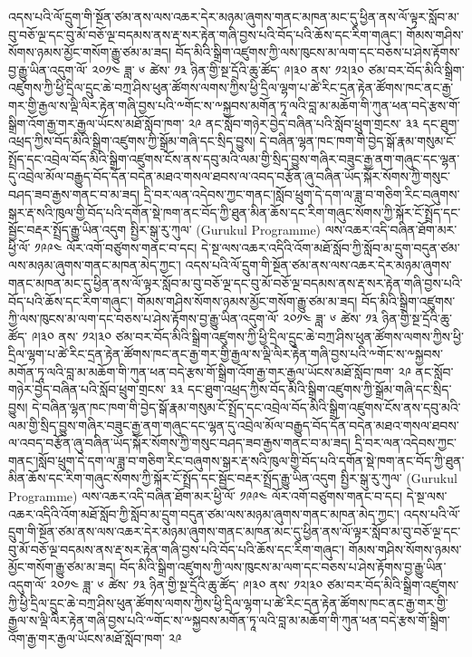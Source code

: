 \documentclass{article}
\begin{document}
འདས་པའི་ལོ་དྲུག་གི་སྔོན་ཙམ་ནས་ལས་འཆར་དེར་མཉམ་ཞུགས་གནང་མཁན་མང་དུ་ཕྱིན་ནས་ལོ་ལྟར་སློབ་མ་བུ་བཅོ་ལྔ་དང་བུ་མོ་བཅོ་ལྔ་བདམས་ནས་རྡ་སར་རྟེན་གཞི་བྱས་པའི་བོད་པའི་ཆོས་དང་རིག་གཞུང་། གོམས་གཤིས་སོགས་ཉམས་མྱོང་གསོག་རྒྱུ་ཙམ་མ་ཟད། བོད་མིའི་སྒྲིག་འཛུགས་ཀྱི་ལས་ཁུངས་མ་ལག་དང་བཅས་པ་ཤེས་རྟོགས་བྱ་རྒྱུ་ཡིན་འདུག་ལོ་ ༢༠༡༤ ཟླ་ ༦ ཚེས་ ༡༣ ཉིན་གྱི་སྔ་དྲོའི་ཆུ་ཚོད་ ༩།༣༠ ནས་ ༡༢།༣༠ ཙམ་བར་བོད་མིའི་སྒྲིག་འཛུགས་ཀྱི་ཕྱི་དྲིལ་དྲུང་ཆེ་བཀྲ་ཤིས་ཕུན་ཚོགས་ལགས་ཀྱིས་ཕྱི་དྲིལ་ལྷག་པ་ཚེ་རིང་དྲན་རྟེན་ཚོགས་ཁང་ནང་རྒྱ་གར་གྱི་རྒྱལ་ས་ལྡི་ལིར་རྟེན་གཞི་བྱས་པའི་༸གོང་ས་༸སྐྱབས་མགོན་ཏཱ་ལའི་བླ་མ་མཆོག་གི་ཀུན་ཕན་བདེ་རྩས་གོ་སྒྲིག་འོག་རྒྱ་གར་རྒྱལ་ཡོངས་མཐོ་སློབ་ཁག་ ༢༩ ནང་སློབ་གཉེར་བྱེད་བཞིན་པའི་སློབ་ཕྲུག་གྲངས་ ༣༣ དང་ཐུག་འཕྲད་ཀྱིས་བོད་མིའི་སྒྲིག་འཛུགས་ཀྱི་སྒྲོམ་གཞི་དང་སྲིད་བྱུས། དེ་བཞིན་ལྷན་ཁང་ཁག་གི་བྱེད་སྒོ་རྣམ་གསུམ་ངོ་སྤྲོད་དང་འབྲེལ་བོད་མིའི་སྒྲིག་འཛུགས་ངོས་ནས་དབུ་མའི་ལམ་གྱི་སྲིད་བྱུས་གཞིར་བཟུང་རྒྱ་ནག་གཞུང་དང་ལྷན་དུ་འབྲེལ་མོལ་བརྒྱུད་བོད་དོན་བདེན་མཐའ་གསལ་ཐབས་ལ་འབད་བརྩོན་ཞུ་བཞིན་ཡོད་སྐོར་སོགས་ཀྱི་གསུང་བཤད་ཟབ་རྒྱས་གནང་བ་མ་ཟད། དྲི་བར་ལན་འདེབས་ཀྱང་གནང་།སློབ་ཕྲུག་དེ་དག་ལ་ཟླ་བ་གཅིག་རིང་བཞུགས་སྒར་རྡ་སའི་ཁུལ་གྱི་བོད་པའི་དགོན་སྡེ་ཁག་ནང་བོད་ཀྱི་ཐུན་མིན་ཆོས་དང་རིག་གཞུང་སོགས་ཀྱི་སྐོར་ངོ་སྤྲོད་དང་སྦྱོང་བརྡར་སྤྲོད་རྒྱུ་ཡིན་འདུག སྤྱིར་སྒུ་རུ་ཀུལ་ (Gurukul Programme) ལས་འཆར་འདི་བཞིན་ཐོག་མར་ཕྱི་ལོ་ ༡༩༩༤ ལོར་འགོ་བཙུགས་གནང་བ་དང། དེ་སྔ་ལས་འཆར་འདིའི་འོག་མཐོ་སློབ་ཀྱི་སློབ་མ་དྲུག་བདུན་ཙམ་ལས་མཉམ་ཞུགས་གནང་མཁན་མེད་ཀྱང་། འདས་པའི་ལོ་དྲུག་གི་སྔོན་ཙམ་ནས་ལས་འཆར་དེར་མཉམ་ཞུགས་གནང་མཁན་མང་དུ་ཕྱིན་ནས་ལོ་ལྟར་སློབ་མ་བུ་བཅོ་ལྔ་དང་བུ་མོ་བཅོ་ལྔ་བདམས་ནས་རྡ་སར་རྟེན་གཞི་བྱས་པའི་བོད་པའི་ཆོས་དང་རིག་གཞུང་། གོམས་གཤིས་སོགས་ཉམས་མྱོང་གསོག་རྒྱུ་ཙམ་མ་ཟད། བོད་མིའི་སྒྲིག་འཛུགས་ཀྱི་ལས་ཁུངས་མ་ལག་དང་བཅས་པ་ཤེས་རྟོགས་བྱ་རྒྱུ་ཡིན་འདུག་ལོ་ ༢༠༡༤ ཟླ་ ༦ ཚེས་ ༡༣ ཉིན་གྱི་སྔ་དྲོའི་ཆུ་ཚོད་ ༩།༣༠ ནས་ ༡༢།༣༠ ཙམ་བར་བོད་མིའི་སྒྲིག་འཛུགས་ཀྱི་ཕྱི་དྲིལ་དྲུང་ཆེ་བཀྲ་ཤིས་ཕུན་ཚོགས་ལགས་ཀྱིས་ཕྱི་དྲིལ་ལྷག་པ་ཚེ་རིང་དྲན་རྟེན་ཚོགས་ཁང་ནང་རྒྱ་གར་གྱི་རྒྱལ་ས་ལྡི་ལིར་རྟེན་གཞི་བྱས་པའི་༸གོང་ས་༸སྐྱབས་མགོན་ཏཱ་ལའི་བླ་མ་མཆོག་གི་ཀུན་ཕན་བདེ་རྩས་གོ་སྒྲིག་འོག་རྒྱ་གར་རྒྱལ་ཡོངས་མཐོ་སློབ་ཁག་ ༢༩ ནང་སློབ་གཉེར་བྱེད་བཞིན་པའི་སློབ་ཕྲུག་གྲངས་ ༣༣ དང་ཐུག་འཕྲད་ཀྱིས་བོད་མིའི་སྒྲིག་འཛུགས་ཀྱི་སྒྲོམ་གཞི་དང་སྲིད་བྱུས། དེ་བཞིན་ལྷན་ཁང་ཁག་གི་བྱེད་སྒོ་རྣམ་གསུམ་ངོ་སྤྲོད་དང་འབྲེལ་བོད་མིའི་སྒྲིག་འཛུགས་ངོས་ནས་དབུ་མའི་ལམ་གྱི་སྲིད་བྱུས་གཞིར་བཟུང་རྒྱ་ནག་གཞུང་དང་ལྷན་དུ་འབྲེལ་མོལ་བརྒྱུད་བོད་དོན་བདེན་མཐའ་གསལ་ཐབས་ལ་འབད་བརྩོན་ཞུ་བཞིན་ཡོད་སྐོར་སོགས་ཀྱི་གསུང་བཤད་ཟབ་རྒྱས་གནང་བ་མ་ཟད། དྲི་བར་ལན་འདེབས་ཀྱང་གནང་།སློབ་ཕྲུག་དེ་དག་ལ་ཟླ་བ་གཅིག་རིང་བཞུགས་སྒར་རྡ་སའི་ཁུལ་གྱི་བོད་པའི་དགོན་སྡེ་ཁག་ནང་བོད་ཀྱི་ཐུན་མིན་ཆོས་དང་རིག་གཞུང་སོགས་ཀྱི་སྐོར་ངོ་སྤྲོད་དང་སྦྱོང་བརྡར་སྤྲོད་རྒྱུ་ཡིན་འདུག སྤྱིར་སྒུ་རུ་ཀུལ་ (Gurukul Programme) ལས་འཆར་འདི་བཞིན་ཐོག་མར་ཕྱི་ལོ་ ༡༩༩༤ ལོར་འགོ་བཙུགས་གནང་བ་དང། དེ་སྔ་ལས་འཆར་འདིའི་འོག་མཐོ་སློབ་ཀྱི་སློབ་མ་དྲུག་བདུན་ཙམ་ལས་མཉམ་ཞུགས་གནང་མཁན་མེད་ཀྱང་། འདས་པའི་ལོ་དྲུག་གི་སྔོན་ཙམ་ནས་ལས་འཆར་དེར་མཉམ་ཞུགས་གནང་མཁན་མང་དུ་ཕྱིན་ནས་ལོ་ལྟར་སློབ་མ་བུ་བཅོ་ལྔ་དང་བུ་མོ་བཅོ་ལྔ་བདམས་ནས་རྡ་སར་རྟེན་གཞི་བྱས་པའི་བོད་པའི་ཆོས་དང་རིག་གཞུང་། གོམས་གཤིས་སོགས་ཉམས་མྱོང་གསོག་རྒྱུ་ཙམ་མ་ཟད། བོད་མིའི་སྒྲིག་འཛུགས་ཀྱི་ལས་ཁུངས་མ་ལག་དང་བཅས་པ་ཤེས་རྟོགས་བྱ་རྒྱུ་ཡིན་འདུག་ལོ་ ༢༠༡༤ ཟླ་ ༦ ཚེས་ ༡༣ ཉིན་གྱི་སྔ་དྲོའི་ཆུ་ཚོད་ ༩།༣༠ ནས་ ༡༢།༣༠ ཙམ་བར་བོད་མིའི་སྒྲིག་འཛུགས་ཀྱི་ཕྱི་དྲིལ་དྲུང་ཆེ་བཀྲ་ཤིས་ཕུན་ཚོགས་ལགས་ཀྱིས་ཕྱི་དྲིལ་ལྷག་པ་ཚེ་རིང་དྲན་རྟེན་ཚོགས་ཁང་ནང་རྒྱ་གར་གྱི་རྒྱལ་ས་ལྡི་ལིར་རྟེན་གཞི་བྱས་པའི་༸གོང་ས་༸སྐྱབས་མགོན་ཏཱ་ལའི་བླ་མ་མཆོག་གི་ཀུན་ཕན་བདེ་རྩས་གོ་སྒྲིག་འོག་རྒྱ་གར་རྒྱལ་ཡོངས་མཐོ་སློབ་ཁག་ ༢༩ 
\end{document}
